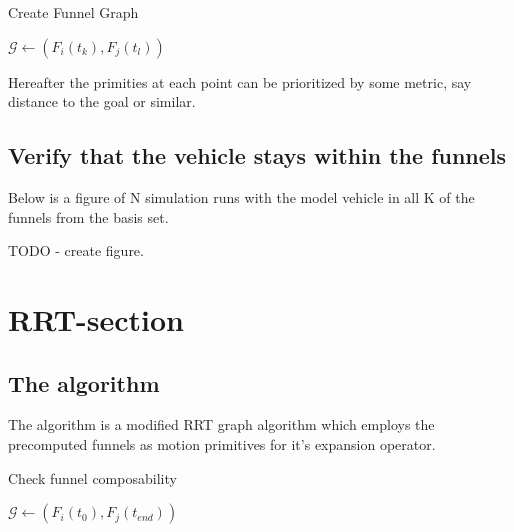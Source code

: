 \begin{algorithm}
  \caption{Create Funnel Graph}
  \label{alg:create-funnel-graph}
  \DontPrintSemicolon \SetAlgoNoLine

   

   {  {
       {  {
           { \(\mathcal{G}
            \leftarrow{} \left( F_{i}(t_{k}), F_{j}(t_{l}) \right)\) } \; } \; }
      \; }\; }\;

\end{algorithm}

Hereafter the primities at each point can be prioritized by some metric, say
distance to the goal or similar.

\subsection{Verify that the vehicle stays within the funnels}

Below is a figure of N simulation runs with the model vehicle in all K of the
funnels from the basis set.

TODO - create figure.


\section{RRT-section}

\subsection{The \rrtfunnel{} algorithm}

The \rrtfunnel{} algorithm is a modified \ac{RRT} graph algorithm which employs
the precomputed funnels as motion primitives for it's expansion operator.

\begin{algorithm}
  \caption{Check funnel composability}
  \label{alg:create-funnel-graph}
  \DontPrintSemicolon \SetAlgoNoLine

   

   {  {
       { \(\mathcal{G} \leftarrow{}
        \left( F_{i}(t_{0}), F_{j}(t_{end}) \right)\) } \; }\; }\;

\end{algorithm}

